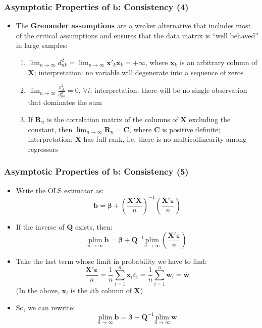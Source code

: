 \documentclass[10pt]{beamer}
\newcommand{\plim}{\mathrm{plim}}
\theoremstyle{definition}
\begin{document}
\begin{frame}[fragile]
	\frametitle{Asymptotic Properties of $\mathbf{b}$: Consistency (4)}
	\begin{itemize}
		\item The \textbf{Grenander assumptions} are a weaker alternative that includes most of the critical assumptions and ensures that the data matrix is ``well behaved'' in large samples:
		\begin{enumerate}
			\item $\displaystyle \lim_{n\to\infty}d^{2}_{nk} = \lim_{n\to \infty}\mathbf{x}'_{k}\mathbf{x}_{k} = + \infty$, where $\mathbf{x}_{k}$ is an arbitrary column of $\mathbf{X}$; interpretation: no variable will degenerate into a sequence of zeros
			\item $\displaystyle \lim_{n\to\infty}\frac{x_{ik}^{2}}{d^{2}_{nk}} = 0,\,\forall i$; interpretation: there will be no single observation that dominates the sum
			\item If $\mathbf{R}_{n}$ is the correlation matrix of the columns of $\mathbf{X}$ excluding the constant, then $\displaystyle \lim_{n\to\infty}\mathbf{R}_{n} = \mathbf{C}$, where $\mathbf{C}$ is positive definite; interpretation: $\mathbf{X}$ has full rank, i.e. there is no multicollinearity among regressors
		\end{enumerate}
	\end{itemize}
\end{frame}

\begin{frame}[fragile]
	\frametitle{Asymptotic Properties of $\mathbf{b}$: Consistency (5)}
	\begin{itemize}
		\item Write the OLS estimator as: 
		\[
		\mathbf{b} = \bm\beta + \left(\frac{\mathbf{X'X}}{n}\right)^{-1}\left(\frac{\mathbf{X'}\bm\varepsilon}{n}\right)
		\]
		\item If the inverse of $\mathbf{Q}$ exists, then:
		\[
		\underset{n\to\infty}{\plim}\,\mathbf{b} = \bm\beta + \mathbf{Q}^{-1}\underset{n\to\infty}{\plim}\,\left(\frac{\mathbf{X'}\bm\varepsilon}{n}\right)
		\]
		\item Take the last term whose limit in probability we have to find:
		\[
		\frac{\mathbf{X'}\bm\varepsilon}{n} = \frac{1}{n}\sum_{i=1}^{n}\mathbf{x}_{i}\varepsilon_{i} =  \frac{1}{n}\sum_{i=1}^{n}\mathbf{w}_{i} =  \mathbf{\overline{w}}
		\]
		(In the above, $\mathbf{x}_{i}$ is the $i$th column of $\mathbf{X}$)
		\item So, we can rewrite:
		\[
		\underset{n\to\infty}{\plim}\,\mathbf{b} = \bm\beta + \mathbf{Q}^{-1}\underset{n\to\infty}{\plim}\,\mathbf{\overline{w}}
		\]
	\end{itemize}
\end{frame}
\end{document}
